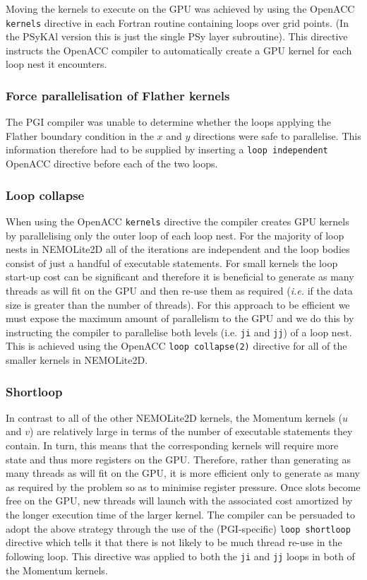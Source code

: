 \documentclass[gmdd, manuscript]{copernicus}
\begin{document}
Moving the kernels to execute on the GPU was achieved by using the
OpenACC \texttt{kernels} directive in each Fortran routine containing
loops over grid points. (In the {PS}y{KA}l version this is just the
single {PS}y layer subroutine). This directive instructs the OpenACC
compiler to automatically create a GPU kernel for each loop nest it
encounters.

\subsubsection{Force parallelisation of Flather kernels}

The PGI compiler was unable to determine whether the loops applying
the Flather boundary condition in the $x$ and $y$ directions were safe
to parallelise. This information therefore had to be supplied by
inserting a \texttt{loop independent} OpenACC directive before each of
the two loops.

\subsubsection{Loop collapse}

When using the OpenACC \texttt{kernels} directive the compiler creates
GPU kernels by parallelising only the outer loop of each loop nest.
For the majority of loop nests in NEMOLite2D all of the iterations are
independent and the loop bodies consist of just a handful of
executable statements. For small kernels the loop start-up cost can be
significant and therefore it is beneficial to generate as many threads
as will fit on the GPU and then re-use them as required (\textit{i.e.} if the
data size is greater than the number of threads). For this approach to
be efficient we must expose the maximum amount of parallelism to the
GPU and we do this by instructing the compiler to parallelise both
levels (i.e. \texttt{ji} and \texttt{jj}) of a loop nest. This is
achieved using the OpenACC \texttt{loop collapse(2)} directive for all
of the smaller kernels in NEMOLite2D.

\subsubsection{Shortloop}

In contrast to all of the other NEMOLite2D kernels, the Momentum
kernels ($u$ and $v$) are relatively large in terms of the number of
executable statements they contain. In turn, this means that the
corresponding kernels will require more state and thus more registers
on the GPU. Therefore, rather than generating as many threads as will
fit on the GPU, it is more efficient only to generate as many as
required by the problem so as to minimise register pressure. Once
slots become free on the GPU, new threads will launch with the
associated cost amortized by the longer execution time of the larger
kernel. The compiler can be persuaded
to adopt the above strategy through the use of the (PGI-specific)
\texttt{loop shortloop} directive which tells it that there is not
likely to be much thread re-use in the following loop. This directive
was applied to both the \texttt{ji} and \texttt{jj} loops in both of
the Momentum kernels.
\end{document}
